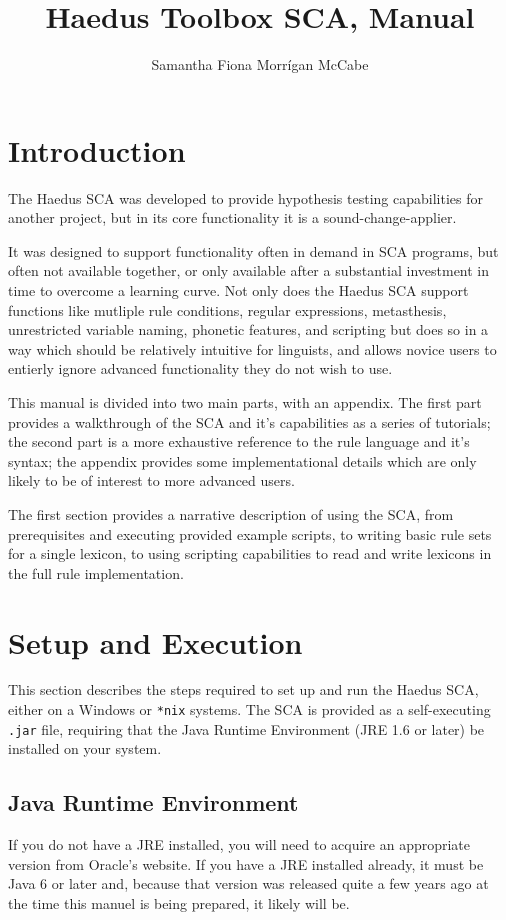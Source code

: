 \documentclass[10pt,letterpaper]{article}
\title{Haedus Toolbox SCA, Manual}
\author{Samantha Fiona Morrígan McCabe}
\begin{document}
\maketitle
\tableofcontents

\section{Introduction}\label{sec:intro}
The Haedus SCA was developed to provide hypothesis testing capabilities for another project, but in its core functionality it is a sound-change-applier.

It was designed to support functionality often in demand in SCA programs, but often not available together, or only available after a substantial investment in time to overcome a learning curve. Not only does the Haedus SCA support functions like mutliple rule conditions, regular expressions, metasthesis, unrestricted variable naming, phonetic features, and scripting but does so in a way which should be relatively intuitive for linguists, and allows novice users to entierly ignore advanced functionality they do not wish to use.

This manual is divided into two main parts, with an appendix. The first part provides a walkthrough of the SCA and it's capabilities as a series of tutorials; the second part is a more exhaustive reference to the rule language and it's syntax; the appendix provides some implementational details which are only likely to be of interest to more advanced users.

The first section provides a narrative description of using the SCA, from prerequisites and executing provided example scripts, to writing basic rule sets for a single lexicon, to using scripting capabilities to read and write lexicons in the full rule implementation.

\section{Setup and Execution}\label{sec:setup}
This section describes the steps required to set up and run the Haedus SCA, either on a Windows or \texttt{*nix} systems. The SCA is provided as a self-executing \texttt{.jar} file, requiring that the Java Runtime Environment (JRE 1.6 or later) be installed on your system.

\subsection{Java Runtime Environment}\label{sec:java}
If you do not have a JRE installed, you will need to acquire an appropriate version from Oracle's website. If you have a JRE installed already, it must be Java 6 or later and, because that version was released quite a few years ago at the time this manuel is being prepared, it likely will be.
\end{document}
